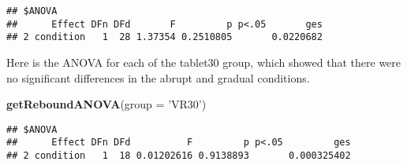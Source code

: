 \documentclass[]{article}
\newenvironment{Shaded}{\begin{snugshade}}{\end{snugshade}}
\newcommand{\KeywordTok}[1]{\textcolor[rgb]{0.13,0.29,0.53}{\textbf{#1}}}
\newcommand{\DataTypeTok}[1]{\textcolor[rgb]{0.13,0.29,0.53}{#1}}
\newcommand{\StringTok}[1]{\textcolor[rgb]{0.31,0.60,0.02}{#1}}
\newcommand{\NormalTok}[1]{#1}
\begin{document}
\begin{verbatim}
## $ANOVA
##      Effect DFn DFd       F         p p<.05       ges
## 2 condition   1  28 1.37354 0.2510805       0.0220682
\end{verbatim}

Here is the ANOVA for each of the tablet30 group, which showed that
there were no significant differences in the abrupt and gradual
conditions.

\begin{Shaded}
\begin{Highlighting}[]
\KeywordTok{getReboundANOVA}\NormalTok{(}\DataTypeTok{group =} \StringTok{'VR30'}\NormalTok{)}
\end{Highlighting}
\end{Shaded}

\begin{verbatim}
## $ANOVA
##      Effect DFn DFd          F         p p<.05         ges
## 2 condition   1  18 0.01202616 0.9138893       0.000325402
\end{verbatim}
\end{document}

